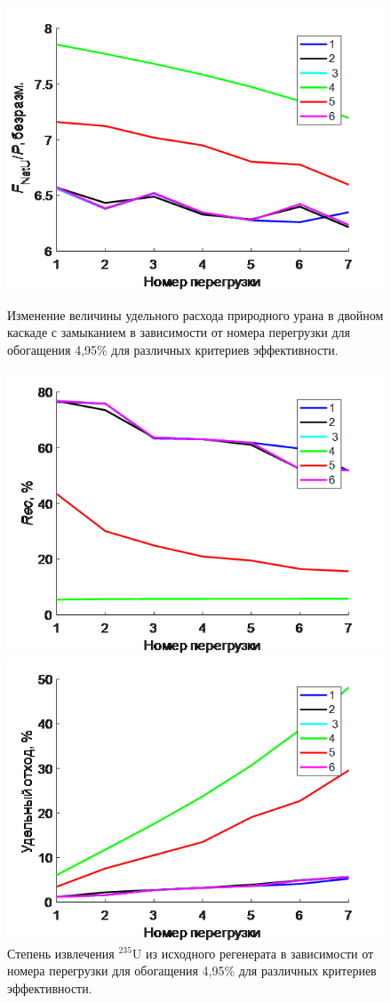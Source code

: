 \begin{figure}[ht]
    \begin{minipage}{.5\textwidth}
      \centering
      \includegraphics[width=.8\linewidth]{images/net/3}  
      \caption{Изменение величины удельного расхода природного урана в двойном каскаде с замыканием в зависимости от номера перегрузки для обогащения 4,95\% для различных критериев эффективности.}
      \label{3}
    \end{minipage}
    \begin{minipage}{.5\textwidth}
      \centering
      \includegraphics[width=.8\linewidth]{images/net/4}  
      \caption{Степень извлечения $^{235}$U из исходного регенерата в зависимости от номера перегрузки для обогащения 4,95\% для различных критериев эффективности.}
      \label{4}
    \end{minipage}
    \begin{minipage}{.5\textwidth}
      \centering
      \includegraphics[width=.8\linewidth]{images/net/5}  

\end{minipage}
\end{figure}
